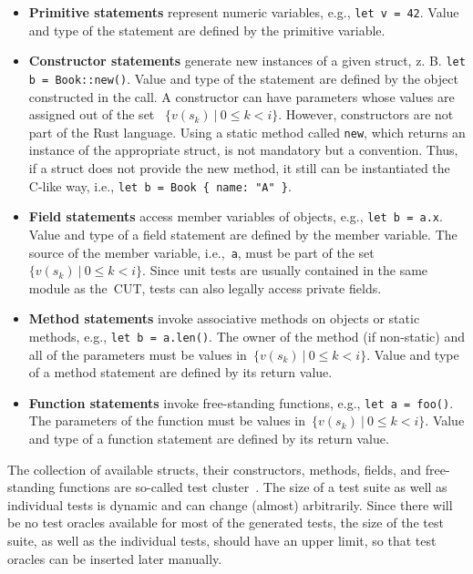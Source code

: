 \documentclass{article}
\begin{document}
\begin{itemize}
    \item \textbf{Primitive statements} represent numeric variables, e.g., \lstinline{let v = 42}. Value and type of the statement are defined by the primitive variable.
    \item \textbf{Constructor statements} generate new instances of a given struct, z. B. \lstinline{let b = Book::new()}. Value and type of the statement are defined by the object constructed in the call. A constructor can have parameters whose values are assigned out of the set ~$\{v(s_k)~|~0 \leq k < i\}$. However, constructors are not part of the Rust language. Using a static method called \lstinline{new}, which returns an instance of the appropriate struct, is not mandatory but a convention. Thus, if a struct does not provide the new method, it still can be instantiated the C-like way, i.e., \lstinline|let b = Book { name: "A" }|.
    \item \textbf{Field statements} access member variables of objects, e.g., \lstinline{let b = a.x}. Value and type of a field statement are defined by the member variable. The source of the member variable, i.e.,~\lstinline{a}, must be part of the set~$\{v(s_k)~|~0 \leq k < i\}$. Since unit tests are usually contained in the same module as the~\ac{CUT}, tests can also legally access private fields.
    \item \textbf{Method statements} invoke associative methods on objects or static methods, e.g., \lstinline{let b = a.len()}. The owner of the method (if non-static) and all of the parameters must be values in~${\{v(s_k)~|~0 \leq k < i\}}$. Value and type of a method statement are defined by its return value.
    \item \textbf{Function statements} invoke free-standing functions, e.g., \lstinline{let a = foo()}. The parameters of the function must be values in~$\{v(s_k)~|~0 \leq k < i\}$. Value and type of a function statement are defined by its return value.
\end{itemize}

The collection of available structs, their constructors, methods, fields, and free-standing functions are so-called test cluster~\cite{Fraser_2011}. The size of a test suite as well as individual tests is dynamic and can change (almost) arbitrarily. Since there will be no test oracles available for most of the generated tests, the size of the test suite, as well as the individual tests, should have an upper limit, so that test oracles can be inserted later manually.
\end{document}

